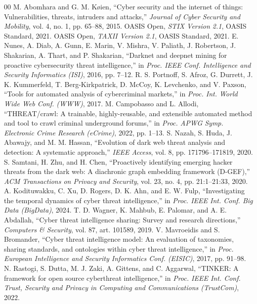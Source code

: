 \documentclass[conference]{IEEEtran}
\begin{document}
\begin{thebibliography}{00}
 M. Abomhara and G. M. Køien, ``Cyber security and the internet of things: Vulnerabilities, threats, intruders and attacks,'' \textit{Journal of Cyber Security and Mobility}, vol. 4, no. 1, pp. 65--88, 2015.
 OASIS Open, \textit{STIX Version 2.1}, OASIS Standard, 2021.
 OASIS Open, \textit{TAXII Version 2.1}, OASIS Standard, 2021.
 E. Nunes, A. Diab, A. Gunn, E. Marin, V. Mishra, V. Paliath, J. Robertson, J. Shakarian, A. Thart, and P. Shakarian, ``Darknet and deepnet mining for proactive cybersecurity threat intelligence,'' in \textit{Proc. IEEE Conf. Intelligence and Security Informatics (ISI)}, 2016, pp. 7--12.
 R. S. Portnoff, S. Afroz, G. Durrett, J. K. Kummerfeld, T. Berg-Kirkpatrick, D. McCoy, K. Levchenko, and V. Paxson, ``Tools for automated analysis of cybercriminal markets,'' in \textit{Proc. Int. World Wide Web Conf. (WWW)}, 2017.
 M. Campobasso and L. Allodi, ``THREAT/crawl: A trainable, highly-reusable, and extensible automated method and tool to crawl criminal underground forums,'' in \textit{Proc. APWG Symp. Electronic Crime Research (eCrime)}, 2022, pp. 1--13.
 S. Nazah, S. Huda, J. Abawajy, and M. M. Hassan, ``Evolution of dark web threat analysis and detection: A systematic approach,'' \textit{IEEE Access}, vol. 8, pp. 171796--171819, 2020.
 S. Samtani, H. Zhu, and H. Chen, ``Proactively identifying emerging hacker threats from the dark web: A diachronic graph embedding framework (D-GEF),'' \textit{ACM Transactions on Privacy and Security}, vol. 23, no. 4, pp. 21:1--21:33, 2020.
 A. Kodituwakku, C. Xu, D. Rogers, D. K. Ahn, and E. W. Fulp, ``Investigating the temporal dynamics of cyber threat intelligence,'' in \textit{Proc. IEEE Int. Conf. Big Data (BigData)}, 2024.
 T. D. Wagner, K. Mahbub, E. Palomar, and A. E. Abdallah, ``Cyber threat intelligence sharing: Survey and research directions,'' \textit{Computers \& Security}, vol. 87, art. 101589, 2019.
 V. Mavroeidis and S. Bromander, ``Cyber threat intelligence model: An evaluation of taxonomies, sharing standards, and ontologies within cyber threat intelligence,'' in \textit{Proc. European Intelligence and Security Informatics Conf. (EISIC)}, 2017, pp. 91--98.
 N. Rastogi, S. Dutta, M. J. Zaki, A. Gittens, and C. Aggarwal, ``TINKER: A framework for open source cyberthreat intelligence,'' in \textit{Proc. IEEE Int. Conf. Trust, Security and Privacy in Computing and Communications (TrustCom)}, 2022.

\end{thebibliography}
\end{document}
